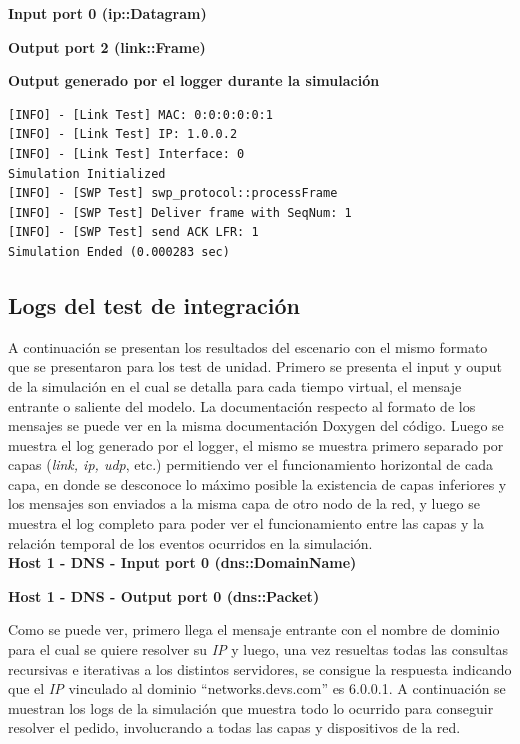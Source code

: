 \documentclass[10pt,a4paper]{article}
\begin{document}
\textbf{Input port 0 (ip::Datagram)}


\textbf{Output port 2 (link::Frame)}


\textbf{Output generado por el logger durante la simulación}
\begin{lstlisting}
[INFO] - [Link Test] MAC: 0:0:0:0:0:1
[INFO] - [Link Test] IP: 1.0.0.2
[INFO] - [Link Test] Interface: 0
Simulation Initialized
[INFO] - [SWP Test] swp_protocol::processFrame
[INFO] - [SWP Test] Deliver frame with SeqNum: 1
[INFO] - [SWP Test] send ACK LFR: 1
Simulation Ended (0.000283 sec)
\end{lstlisting}

\subsection{Logs del test de integración}
\label{appendix: integration test}

A continuación se presentan los resultados del escenario con el mismo formato que se presentaron para los test de unidad. Primero se presenta el input y ouput de la simulación en el cual se detalla para cada tiempo virtual, el mensaje entrante o saliente del modelo. La documentación respecto al formato de los mensajes se puede ver en la misma documentación Doxygen del código. Luego se muestra el log generado por el logger, el mismo se muestra primero separado por capas (\textit{link, ip, udp}, etc.) permitiendo ver el funcionamiento horizontal de cada capa, en donde se desconoce lo máximo posible la existencia de capas inferiores y los mensajes son enviados a la misma capa de otro nodo de la red, y luego se muestra el log completo para poder ver el funcionamiento entre las capas y la relación temporal de los eventos ocurridos en la simulación. \\

\textbf{Host 1 - DNS - Input port 0 (dns::DomainName)}


\textbf{Host 1 - DNS - Output port 0 (dns::Packet)}


Como se puede ver, primero llega el mensaje entrante con el nombre de dominio para el cual se quiere resolver su \textit{IP} y luego, una vez resueltas todas las consultas recursivas e iterativas a los distintos servidores, se consigue la respuesta indicando que el \textit{IP} vinculado al dominio ``networks.devs.com'' es 6.0.0.1. A continuación se muestran los logs de la simulación que muestra todo lo ocurrido para conseguir resolver el pedido, involucrando a todas las capas y dispositivos de la red. \\
\end{document}
